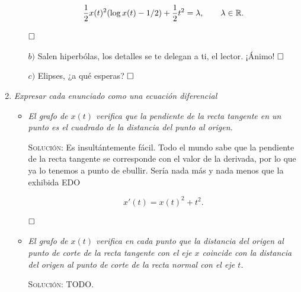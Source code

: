 \documentclass{article}
\begin{document}
\begin{enumerate}
\begin{itemize}
        \[\frac{1}{2}x(t)^2(\log x(t) - 1/2) + \frac{1}{2}t^2 = \lambda, \hspace{20px} \lambda \in \mathbb{R}.\]

        $\hfill\square$

        \vspace{7px}

        \item[$b)$] Salen hiperbólas, los detalles se te delegan a ti, el lector. ¡Ánimo! $\hfill\square$

        \vspace{7px}

        \item[$c)$] Elipses, ¿a qué esperas? $\hfill\square$
    \end{itemize}

    \vspace{12px}

    \item \textit{Expresar cada enunciado como una ecuación diferencial}
    
    \begin{itemize}
        \item \textit{El grafo de $x(t)$ verifica que la pendiente de la recta tangente en un punto es el cuadrado de la distancia del punto al origen.}

        \vspace{7px}

        \textsc{Solución:} Es insultántemente fácil. Todo el mundo sabe que la pendiente de la recta tangente se corresponde con el valor de la derivada, por lo que ya lo tenemos a punto de ebullir.
        Sería nada más y nada menos que la exhibida EDO

        \[x'(t) = x(t)^2 + t^2.\]

        $\hfill\square$
        
        \vspace{7px}

        \item \textit{El grafo de $x(t)$ verifica en cada punto que la distancia del origen al punto de corte de la recta tangente con el eje $x$ coincide con la distancia del origen al punto de corte de la recta normal con el eje $t$.}

        \vspace{7px}

        \textsc{Solución:} TODO.

        \vspace{7px}


\end{itemize}
\end{enumerate}
\end{document}
